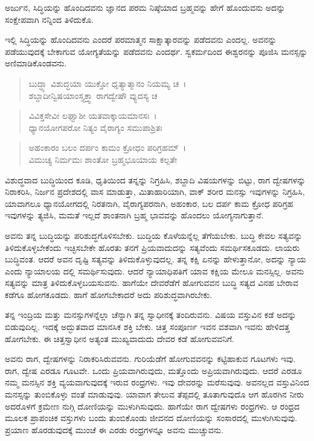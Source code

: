 {\small ಅರ್ಜುನ, ಸಿದ್ಧಿಯನ್ನು ಹೊಂದಿದವನು ಜ್ಞಾನದ ಪರಮ ನಿಷ್ಠೆಯಾದ ಬ್ರಹ್ಮವನ್ನು ಹೇಗೆ ಹೊಂದುವನು ಅದನ್ನು ಸಂಕ್ಷೇಪವಾಗಿ ನನ್ನಿಂದ ತಿಳಿದುಕೊ.}

ಇಲ್ಲಿ ಸಿದ್ಧಿಯನ್ನು ಹೊಂದಿದವನು ಎಂದರೆ ಪರಮಾತ್ಮನ ಸಾಕ್ಷಾತ್ಕಾರವನ್ನು ಪಡೆದವನು ಎಂದಲ್ಲ. ಅವನನ್ನು ಪಡೆಯುವುದಕ್ಕೆ ಬೇಕಾಗುವ ಯೋಗ್ಯತೆಯನ್ನು ಪಡೆದವನು ಎಂದರ್ಥ. ಸ್ವಕರ್ಮದಿಂದ ಈಶ್ವರನನ್ನು ಪೂಜಿಸಿ ಮನಸ್ಸನ್ನು ಅಣಿಮಾಡಿಕೊಂಡವನು.

\begin{verse}
ಬುದ್ಧ್ಯಾ ವಿಶುದ್ಧಯಾ ಯುಕ್ತೋ ಧೃತ್ಯಾತ್ಮಾನಂ ನಿಯಮ್ಯ ಚ~। \\ಶಬ್ದಾದೀನ್ವಿಷಯಾಂಸ್ತ್ಯಕ್ತ್ವಾ ರಾಗದ್ವೇಷೌ ವ್ಯುದಸ್ಯ ಚ 
\end{verse}

\begin{verse}
ವಿವಿಕ್ತಸೇವೀ ಲಘ್ವಾಶೀ ಯತವಾಕ್ಕಾಯಮಾನಸಃ~।\\ಧ್ಯಾನಯೋಗಪರೋ ನಿತ್ಯಂ ವೈರಾಗ್ಯಂ ಸಮುಪಾಶ್ರಿತಃ 
\end{verse}

\begin{verse}
ಅಹಂಕಾರಂ ಬಲಂ ದರ್ಪಂ ಕಾಮಂ ಕ್ರೋಧಂ ಪರಿಗ್ರಹಮ್~।\\ವಿಮುಚ್ಯ ನಿರ್ಮಮಃ ಶಾಂತೋ ಬ್ರಹ್ಮಭೂಯಾಯ ಕಲ್ಪತೇ 
\end{verse}

{\small ವಿಶುದ್ಧವಾದ ಬುದ್ಧಿಯಿಂದ ಕೂಡಿ, ಧೃತಿಯಿಂದ ತನ್ನನ್ನು ನಿಗ್ರಹಿಸಿ, ಶಬ್ದಾದಿ ವಿಷಯಗಳನ್ನು ಬಿಟ್ಟು, ರಾಗ ದ್ವೇಷಗಳನ್ನು ನಿರಾಕರಿಸಿ, ನಿರ್ಜನ ಪ್ರದೇಶದಲ್ಲಿ ವಾಸ ಮಾಡುತ್ತಾ, ಮಿತಾಹಾರಿಯಾಗಿ, ವಾಕ್ ಶರೀರ ಮನಸ್ಸು ಇವುಗಳನ್ನು ನಿಗ್ರಹಿಸಿ, ಯಾವಾಗಲೂ ಧ್ಯಾನಯೋಗದಲ್ಲಿ ನಿರತನಾಗಿ, ವೈರಾಗ್ಯಪರನಾಗಿ, ಅಹಂಕಾರ, ಬಲ ದರ್ಪ ಕಾಮ ಕ್ರೋಧ ಪರಿಗ್ರಹ ಇವುಗಳನ್ನು ತ್ಯಜಿಸಿ, ಮಮತೆ ಇಲ್ಲದೆ ಶಾಂತನಾಗಿ ಬ್ರಹ್ಮ ಭಾವವನ್ನು ಹೊಂದಲು ಯೋಗ್ಯನಾಗುತ್ತಾನೆ.}

ಅವನು ತನ್ನ ಬುದ್ಧಿಯನ್ನು ಪರಿಶುದ್ಧಗೊಳಿಸಬೇಕು. ಬುದ್ಧಿಯ ಕೊಳೆಯನ್ನೆಲ್ಲ ತೆಗೆಯಬೇಕು. ಬುದ್ಧಿ ಕೇವಲ ಸತ್ಯವನ್ನು ತಿಳಿದುಕೊಳ್ಳಬೇಕೆಂದು ಇಚ್ಛಿಸಬೇಕೇ ಹೊರತು ತನಗೆ ಪ್ರಿಯವಾದುದನ್ನು ಸತ್ಯವೆಂದು ಸಮರ್ಥಿಸಕೂಡದು. ಲಾಯರು ಬುದ್ಧಿವಂತ. ಆದರೆ ಅವನ ದೃಷ್ಟಿ ಸತ್ಯವನ್ನು ತಿಳಿದುಕೊಳ್ಳುವುದಲ್ಲ. ತನ್ನ ಕಕ್ಷಿ ಏನನ್ನು ಹೇಳುತ್ತಾನೋ, ಅದನ್ನು ನ್ಯಾಯ ಎಂದು ನ್ಯಾಯಾಲಯ ದಲ್ಲಿ ಸಮರ್ಥಿಸುವುದು. ಆದರೆ ನ್ಯಾಯಾಧಿಪತಿಗೆ ಯಾವ ಕಕ್ಷಿಯ ಮೇಲೂ ಮನಸ್ಸಿಲ್ಲ. ಅವನು ಸತ್ಯವನ್ನು ಮಾತ್ರ ತಿಳಿದುಕೊಳ್ಳಬಯಸುವನು. ಹಾಗೆಯೇ ದೇವರೆಡೆಗೆ ಹೋಗುವವನ ಬುದ್ಧಿ ಸತ್ಯದ ವಿನಹ ಬೇರಾವ ಕಡೆಗೂ ಹೋಗಕೂಡದು. ಹಾಗೆ ಹೋಗಬೇಕಾದರೆ ಅದು ಪರಿಶುದ್ಧವಾಗಿರಬೇಕು.

ತನ್ನ ಇಂದ್ರಿಯ ಮತ್ತು ಮನಸ್ಸುಗಳನ್ನೆಲ್ಲಾ ಚೆನ್ನಾಗಿ ತನ್ನ ಸ್ವಾಧೀನಕ್ಕೆ ತಂದಿರುವನು. ವಿಷಯ ವಸ್ತುವಿನ ಕಡೆ ಅದನ್ನು ಬಿಡುವುದಿಲ್ಲ. ಇದಕ್ಕೆ ಅದ್ಭುತವಾದ ಮಾನಸಿಕ ಶಕ್ತಿ ಬೇಕು. ಚಿತ್ತ ಸಂಪೂರ್ಣ ಇವನ ವಶವಾಗಿ ಇವನು ಹೇಳಿದತ್ತ ಹೋಗಬೇಕು. ಈ ಚಿತ್ತಸ್ವಾಧೀನ ಅತ್ಯಂತ ಮುಖ್ಯವಾದುದು ದೇವರ ಕಡೆ ಹೋಗುವವನಿಗೆ.

ಅವನು ರಾಗ, ದ್ವೇಷಗಳನ್ನು ನಿರಾಕರಿಸಿರುವವನು. ಗುರಿಯೆಡೆಗೆ ಹೋಗುವವನನ್ನು ಕಟ್ಟಿಹಾಕುವ ಗೂಟಗಳು ಇವು. ರಾಗ, ದ್ವೇಷ ಎರಡೂ ಗೂಟವೇ. ಒಂದು ಪ್ರಿಯವಾಗಿರುವುದು, ಮತ್ತೊಂದು ಅಪ್ರಿಯವಾಗಿರುವುದು. ಆದರೆ ಎರಡೂ ನಮ್ಮ ಮನಸ್ಸಿನ ಶಕ್ತಿ ವ್ಯಯವಾಗುವುದಕ್ಕೆ ಇರುವ ರಂಧ್ರಗಳು. ಇವು ದೇವರನ್ನು ಮರೆಸುವುವು. ಅವನಲ್ಲದ ವಸ್ತುವಿನಿಂದ ಮನಸ್ಸನ್ನು ತುಂಬಿಕೊಳ್ಳು ವಂತೆ ಮಾಡುವುವು. ಯಾವಾಗ ತೇಲುವ ತೆಪ್ಪದಲ್ಲಿ ತೂತಾಗುವುದೊ ಆಗ ಹೊರಗಿನ ನೀರು ಅದರೊಳಗೆ ಕ್ರಮೇಣ ನುಗ್ಗಿ ದೋಣಿಯನ್ನು ಮುಳುಗಿಸುವುದು. ಹಾಗೆಯೇ ರಾಗ ದ್ವೇಷಗಳು ರಂಧ್ರಗಳು. ಆ ರಂಧ್ರದ ಮೂಲಕ ಪ್ರಾಪಂಚಿಕ ವಸ್ತುಗಳು ಬಂದು ತುಂಬಿಕೊಂಡು ಜೀವನದ ದೋಣಿಯನ್ನು ಸಂಸಾರದಲ್ಲಿ ಮುಳುಗಿಸುವುವು. ಪ್ರಯಾಣ ಹೊರಡುವುದಕ್ಕೆ ಮುಂಚೆ ಈ ಎರಡು ರಂಧ್ರಗಳನ್ನೂ ಅವನು ಮುಚ್ಚುವನು.

